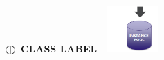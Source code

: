 \documentclass[portrait,final,a0paper]{baposter}
\begin{document}
\begin{poster}
{\begin{minipage}{.30\textwidth}
        	\newline
        	\color{primary1} \hspace{1.7cm}\textbf{$\bigoplus$}
        	\newline
        	\color{Carnelian} \hspace{0.7cm}\textbf{CLASS LABEL}
        	\newline
        	\color{Carnelian} \hspace{0.3cm}\includegraphics[width=2.5cm, height=1.8cm]{pool}	
        \end{minipage}

  }




\end{poster}
\end{document}
